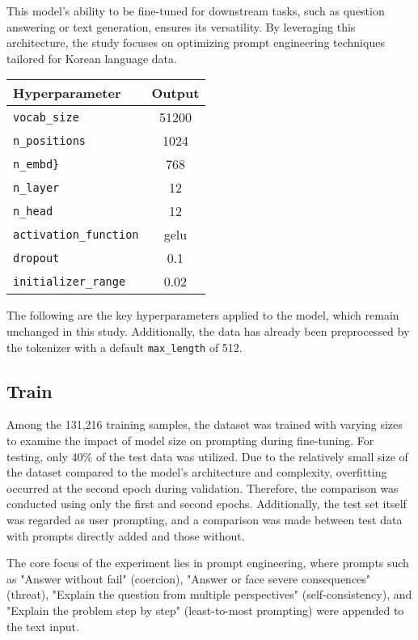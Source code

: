 \documentclass[11pt]{article}
\begin{document}
This model’s ability to be fine-tuned for downstream tasks, such as question answering or text generation, ensures its versatility. By leveraging this architecture, the study focuses on optimizing prompt engineering techniques tailored for Korean language data.

\centering
\begin{tabular}{lc}
\hline
\textbf{Hyperparameter} & \textbf{Output}\\
\hline
\verb|vocab_size| & {51200} \\
\verb|n_positions| & {1024} \\
\verb|n_embd}| & {768} \\ 
\verb|n_layer| & {12} \\ 
\verb|n_head| & {12} \\
\verb|activation_function| & {gelu}  \\ 
\verb|dropout| & {0.1}  \\ 
\verb|initializer_range| & {0.02}  \\\hline
\end{tabular}

\vspace{0.5em} %
{\footnotesize The following are the key hyperparameters applied to the model, which remain unchanged in this study. Additionally, the data has already been preprocessed by the tokenizer with a default \texttt{max\_length} of 512.}

\subsection{Train}

Among the 131,216 training samples, the dataset was trained with varying sizes to examine the impact of model size on prompting during fine-tuning. For testing, only 40\% of the test data was utilized. Due to the relatively small size of the dataset compared to the model’s architecture and complexity, overfitting occurred at the second epoch during validation. Therefore, the comparison was conducted using only the first and second epochs. Additionally, the test set itself was regarded as user prompting, and a comparison was made between test data with prompts directly added and those without.

The core focus of the experiment lies in prompt engineering, where prompts such as "Answer without fail" (coercion), "Answer or face severe consequences" (threat),  "Explain the question from multiple perspectives" (self-consistency), and "Explain the problem step by step" (least-to-most prompting) were appended to the text input.
\end{document}
